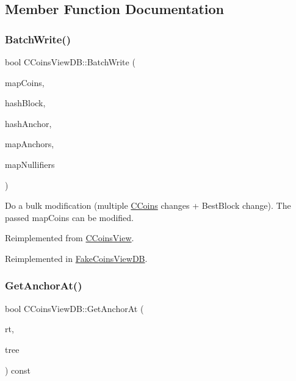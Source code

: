 \subsection{Member Function Documentation}
\mbox{\label{class_c_coins_view_d_b_ab617e4b898f06cec79a2a26fdca9efbd}} 
\subsubsection{\texorpdfstring{Batch\+Write()}{BatchWrite()}}
{\footnotesize\ttfamily bool C\+Coins\+View\+D\+B\+::\+Batch\+Write (\begin{DoxyParamCaption}\item[{\mbox{\hyperlink{coins_8h_a2886ba2fd0428bae777e1cbcabc02834}{C\+Coins\+Map}} \&}]{map\+Coins,  }\item[{const \mbox{\hyperlink{classuint256}{uint256}} \&}]{hash\+Block,  }\item[{const \mbox{\hyperlink{classuint256}{uint256}} \&}]{hash\+Anchor,  }\item[{\mbox{\hyperlink{coins_8h_a070827cc9d21a91b8f4f4f52a6f7c848}{C\+Anchors\+Map}} \&}]{map\+Anchors,  }\item[{\mbox{\hyperlink{coins_8h_ab651cc287e9594190ef77d2fca2b14c7}{C\+Nullifiers\+Map}} \&}]{map\+Nullifiers }\end{DoxyParamCaption})\hspace{0.3cm}{\ttfamily [virtual]}}

Do a bulk modification (multiple \mbox{\hyperlink{class_c_coins}{C\+Coins}} changes + Best\+Block change). The passed map\+Coins can be modified. 

Reimplemented from \mbox{\hyperlink{class_c_coins_view_a6e0ef2f996f5bf9f15c4fcae89333c7d}{C\+Coins\+View}}.



Reimplemented in \mbox{\hyperlink{class_fake_coins_view_d_b_a1108b45f9d165344c7378051e061147b}{Fake\+Coins\+View\+DB}}.

\mbox{\label{class_c_coins_view_d_b_aeaab3bc4b363dbbc9d9a77930209e299}} 
\subsubsection{\texorpdfstring{Get\+Anchor\+At()}{GetAnchorAt()}}
{\footnotesize\ttfamily bool C\+Coins\+View\+D\+B\+::\+Get\+Anchor\+At (\begin{DoxyParamCaption}\item[{const \mbox{\hyperlink{classuint256}{uint256}} \&}]{rt,  }\item[{Z\+C\+Incremental\+Merkle\+Tree \&}]{tree }\end{DoxyParamCaption}) const\hspace{0.3cm}{\ttfamily [virtual]}}



